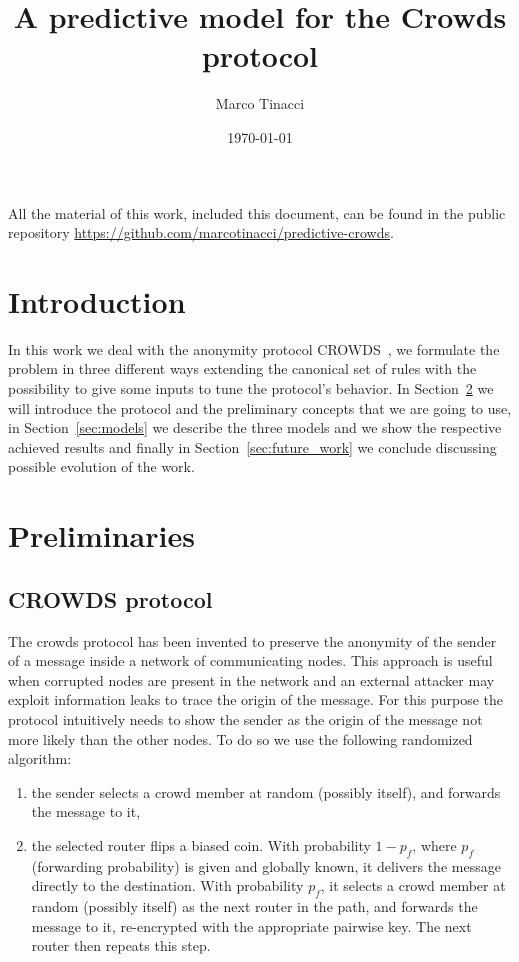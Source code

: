 \documentclass[a4paper, 11pt]{article}
\theoremstyle{definition}
\theoremstyle{remark}
\begin{document}
\title{A predictive model for the Crowds protocol}
\date{\today}
\author{Marco Tinacci}
\maketitle

All the material of this work, included this document, can be found in the public repository \url{https://github.com/marcotinacci/predictive-crowds}.

\section{Introduction} %
\label{sec:introduction}
In this work we deal with the anonymity protocol CROWDS~\cite{DBLP:journals/tissec/ReiterR98}, we formulate the problem in three different ways extending the canonical set of rules with the possibility to give some inputs to tune the protocol's behavior. In Section~\ref{sec:preliminaries} we will introduce the protocol and the preliminary concepts that we are going to use, in Section~\ref{sec:models} we describe the three models and we show the respective achieved results and finally in Section~\ref{sec:future_work} we conclude discussing possible evolution of the work.

\section{Preliminaries} %
\label{sec:preliminaries}

\subsection{CROWDS protocol} %
\label{sub:crowds_protocol}
The crowds protocol has been invented to preserve the anonymity of the sender of a message inside a network of communicating nodes. This approach is useful when corrupted nodes are present in the network and an external attacker may exploit information leaks to trace the origin of the message. For this purpose the protocol intuitively needs to show the sender as the origin of the message not more likely than the other nodes. To do so we use the following randomized algorithm:
\begin{enumerate}
	\item the sender selects a crowd member at random (possibly itself), and forwards the message to it,
	\item the selected router flips a biased coin. With probability $1-p_f$, where $p_f$ (forwarding probability) is given and globally known, it delivers the message directly to the destination. With probability $p_f$, it selects a crowd member at random (possibly itself) as the next router in the path, and forwards the message to it, re-encrypted with the appropriate pairwise key. The next router then repeats this step.
\end{enumerate}
\end{document}
